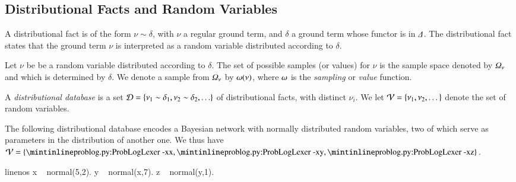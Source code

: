 \subsection{Distributional Facts and Random Variables}\label{sec:dist_facts_rand_var}

\begin{definition}\label{def:distfact}
A distributional fact is of the form $\nu \sim \delta$, with $\nu$ a regular ground term, and $\delta$ a ground term whose functor is in ${\Delta}$. 
The distributional fact states that the ground term $\nu$ is interpreted as a random variable distributed according to $\delta$.
\end{definition}

\begin{definition}\label{def:samplespace}
    Let $\nu$ be be a random variable distributed according to $\delta$. The set of possible samples (or values) for $\nu$ is the sample space denoted by $\Omega_\nu$ and which is determined by $\delta$. We denote a sample from $\Omega_\nu$ by $\omega(\nu)$, where $\omega$ is the {\em sampling} or {\em value} function. 
\end{definition}


\begin{definition}\label{def:distDB}
A \emph{distributional database} is a  set $\mathcal{D}=\{\nu_1 \sim \delta_1,\nu_2 \sim \delta_2, \ldots \}$ of distributional facts, with distinct $\nu_i$. We let $\mathcal{V}= \{\nu_1, \nu_2, \dots \}$ denote the set of random variables.
\end{definition}


\begin{example}\label{ex:dist_db} 
The following distributional database encodes a Bayesian network with  normally distributed random variables, two of which serve as parameters in the distribution of another one. We thus have $\randomvariableset= \{ \text{\probloginline{x}}, \text{\probloginline{y}},\text{\probloginline{z}} \}$.
\begin{problog*}{linenos}
x ~ normal(5,2).
y ~ normal(x,7).
z ~ normal(y,1).
\end{problog*}
\end{example}



